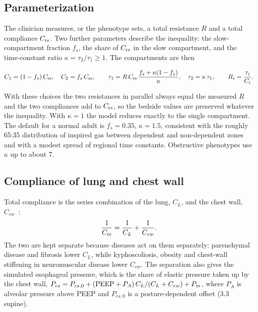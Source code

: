 \subsection{Parameterization}
The clinician measures, or the phenotype sets, a total resistance $R$ and a total compliance $C_{\mathrm{rs}}$. Two further parameters describe the inequality: the slow-compartment fraction $f_s$, the share of $C_{\mathrm{rs}}$ in the slow compartment, and the time-constant ratio $\kappa = \tau_2/\tau_1 \ge 1$. The compartments are then
\begin{keyequation}
\begin{equation}
C_1 = (1-f_s)\,C_{\mathrm{rs}},\quad C_2 = f_s\,C_{\mathrm{rs}},\qquad
\tau_1 = R\,C_{\mathrm{rs}}\,\frac{f_s + \kappa(1-f_s)}{\kappa},\quad \tau_2 = \kappa\,\tau_1,\qquad R_i = \frac{\tau_i}{C_i}.
\label{eq:mech-split}
\end{equation}
\end{keyequation}
With these choices the two resistances in parallel always equal the measured $R$ and the two compliances add to $C_{\mathrm{rs}}$, so the bedside values are preserved whatever the inequality. With $\kappa = 1$ the model reduces exactly to the single compartment. The default for a normal adult is $f_s = 0.35$, $\kappa = 1.5$, consistent with the roughly 65:35 distribution of inspired gas between dependent and non-dependent zones~\citep{milicemili1966} and with a modest spread of regional time constants. Obstructive phenotypes use $\kappa$ up to about 7.

\subsection{Compliance of lung and chest wall}
Total compliance is the series combination of the lung, $C_L$, and the chest wall, $C_{cw}$~\citep{agostoni1964}:
\begin{equation}
\frac{1}{C_{\mathrm{rs}}} = \frac{1}{C_L} + \frac{1}{C_{cw}}.
\label{eq:mech-series}
\end{equation}
The two are kept separate because diseases act on them separately: parenchymal disease and fibrosis lower $C_L$, while kyphoscoliosis, obesity and chest-wall stiffening in neuromuscular disease lower $C_{cw}$. The separation also gives the simulated esophageal pressure, which is the share of elastic pressure taken up by the chest wall, $P_{es} = P_{es,0} + (\mathrm{PEEP} + P_A)\,C_L/(C_L + C_{cw}) + P_m$, where $P_A$ is alveolar pressure above PEEP and $P_{es,0}$ is a posture-dependent offset (\SI{3.3}{\cmH} supine).

